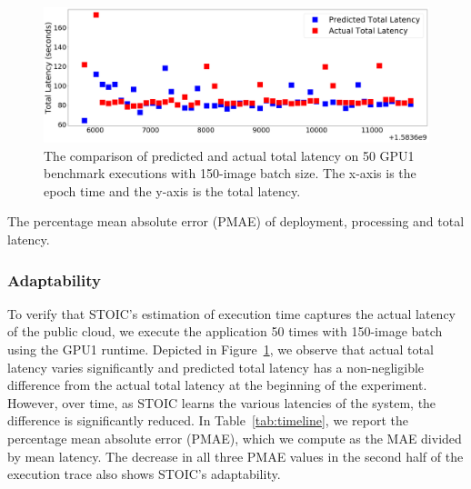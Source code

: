  
 \begin{figure}
    \centering
    \includegraphics[scale=0.20]{figures/timeline.png}
    \caption{The comparison of predicted and actual total latency on 50 GPU1 benchmark executions with 150-image batch size. The x-axis is the epoch time and the y-axis is the total latency. \label{fig:timeline}}
\end{figure}

\begin{table}
\centering

\caption{The percentage mean absolute error (PMAE) of deployment, processing and total latency.  \label{tab:timeline}}
\end{table}
 
 \subsubsection{Adaptability}
 
To verify that STOIC's estimation of execution time captures the actual latency of the public cloud, we execute the application 50 times with 150-image batch using the GPU1 runtime. Depicted in Figure~\ref{fig:timeline}, we observe that actual total latency varies significantly and predicted total latency has a non-negligible difference from the actual total latency at the beginning of the experiment. However, over time, as STOIC learns the various latencies of the system, the difference is significantly reduced. In Table~\ref{tab:timeline}, we report the percentage mean absolute error (PMAE), which we compute as the MAE divided by mean latency. The decrease in all three PMAE values in the second half of the execution trace also shows STOIC's adaptability.

